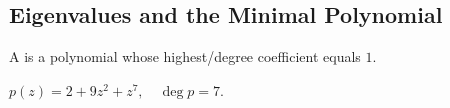 
%

\subsection{Eigenvalues and the Minimal Polynomial}

\begin{mydef} 
  A  is a polynomial whose highest\-/degree coefficient equals $1$.
\end{mydef}
\begin{example}
  $p(z)=2+9z^2+z^7, \quad \deg p = 7$.
\end{example}


